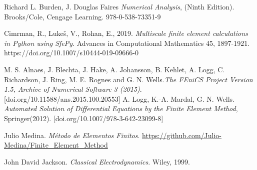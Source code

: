 \documentclass[a4paper]{article}
\begin{document}
\begin{thebibliography}{99}


 Richard L. Burden, J. Douglas Faires \textit{Numerical Analysis}, (Ninth Edition). Brooks/Cole, Cengage Learning. 978-0-538-73351-9

 Cimrman, R., Lukeš, V., Rohan, E., 2019. \textit{Multiscale finite element calculations in Python using SfePy}. Advances in Computational Mathematics 45, 1897-1921. https://doi.org/10.1007/s10444-019-09666-0

M. S. Alnaes, J. Blechta, J. Hake, A. Johansson, B. Kehlet, A. Logg, C. Richardson, J. Ring, M. E. Rognes and G. N. Wells.\textit{The FEniCS Project Version 1.5, Archive of Numerical Software 3 (2015)}. [doi.org/10.11588/ans.2015.100.20553]
\bibitem{}A. Logg, K.-A. Mardal, G. N. Wells. \textit{Automated Solution of Differential Equations by the Finite Element Method}, Springer(2012). [doi.org/10.1007/978-3-642-23099-8]

Julio Medina. \textit{Método de Elementos Finitos}. \url{https://github.com/Julio-Medina/Finite_Element_Method}

  John David Jackson. \textit{Classical Electrodynamics}. Wiley, 1999.





\end{thebibliography}
\end{document}
